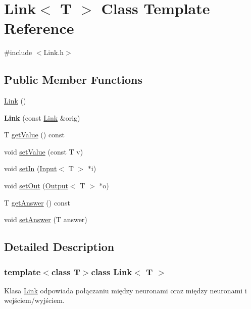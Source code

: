 \hypertarget{class_link}{\section{\-Link$<$ \-T $>$ \-Class \-Template \-Reference}
\label{class_link}
}


{\ttfamily \#include $<$\-Link.\-h$>$}

\subsection*{\-Public \-Member \-Functions}
\begin{DoxyCompactItemize}
\item 
\hyperlink{class_link_a43e11e230dbd74ea650c292b637388ac}{\-Link} ()
\item 
\hypertarget{class_link_a3db35b41536e89e49429c87ef7ae9741}{{\bfseries \-Link} (const \hyperlink{class_link}{\-Link} \&orig)}\label{class_link_a3db35b41536e89e49429c87ef7ae9741}

\item 
\-T \hyperlink{class_link_aff003e24a4024d3f8b72ad43a7ca0f05}{get\-Value} () const 
\item 
void \hyperlink{class_link_ac767dbf3f0e020e3f08fa4ac8bc77fcd}{set\-Value} (const \-T v)
\item 
void \hyperlink{class_link_a7f530e21b1307f5cc361095e85ed8cfb}{set\-In} (\hyperlink{class_input}{\-Input}$<$ \-T $>$ $\ast$i)
\item 
void \hyperlink{class_link_a0ee7aaa6776c87de94483c4db508acd7}{set\-Out} (\hyperlink{class_output}{\-Output}$<$ \-T $>$ $\ast$o)
\item 
\-T \hyperlink{class_link_a5a670e48e85fbf0a03ab2907f147db75}{get\-Answer} () const 
\item 
void \hyperlink{class_link_ab4c5011d91f54ff6aacc31a7d100e209}{set\-Answer} (\-T answer)
\end{DoxyCompactItemize}


\subsection{\-Detailed \-Description}
\subsubsection*{template$<$class \-T$>$class Link$<$ T $>$}

\-Klasa \hyperlink{class_link}{\-Link} odpowiada połączaniu między neuronami oraz między neuronami i wejściem/wyjściem. 

